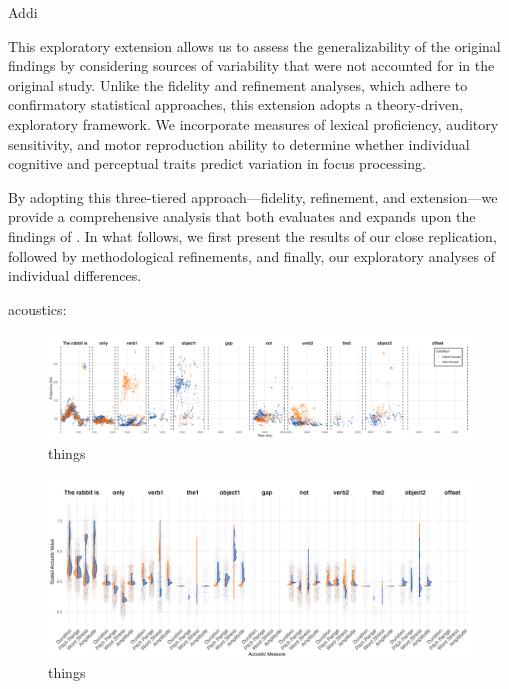 Addi

This exploratory extension allows us to assess the generalizability of the original findings by considering sources of variability that were not accounted for in the original study. Unlike the fidelity and refinement analyses, which adhere to confirmatory statistical approaches, this extension adopts a theory-driven, exploratory framework. We incorporate measures of lexical proficiency, auditory sensitivity, and motor reproduction ability to determine whether individual cognitive and perceptual traits predict variation in focus processing.

By adopting this three-tiered approach—fidelity, refinement, and extension—we provide a comprehensive analysis that both evaluates and expands upon the findings of \citep{Ge2021}. In what follows, we first present the results of our close replication, followed by methodological refinements, and finally, our exploratory analyses of individual differences.

acoustics:
\begin{figure}[H]  %
    \centering
    \includegraphics[width=\textwidth,height=\textheight,keepaspectratio]{viz/accoustic.png}
    \caption{things}
    \label{fig:acoustic}
\end{figure}

\begin{figure}[H]  %
    \centering
    \includegraphics[width=\textwidth,height=\textheight,keepaspectratio]{viz/acoustic_faceted.png}
    \caption{things}
    \label{fig:acoustic_faceted}
\end{figure}



